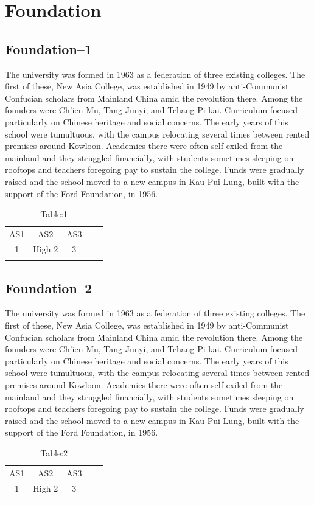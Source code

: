 \section{Foundation}
\subsection{Foundation--1}
The university was formed in 1963 as a federation of three existing colleges. The first of these, New Asia College, was established in 1949 by anti-Communist Confucian scholars from Mainland China amid the revolution there. Among the founders were Ch'ien Mu, Tang Junyi, and Tchang Pi-kai. Curriculum focused particularly on Chinese heritage and social concerns. The early years of this school were tumultuous, with the campus relocating several times between rented premises around Kowloon. Academics there were often self-exiled from the mainland and they struggled financially, with students sometimes sleeping on rooftops and teachers foregoing pay to sustain the college. Funds were gradually raised and the school moved to a new campus in Kau Pui Lung, built with the support of the Ford Foundation, in 1956.
\begin{table}[t]
	\caption{Table:1}
	\label{Table:1}       %
	\centering
	\begin{tabular}{ccccc}
		\hline\noalign{\smallskip}
		AS1 & AS2 &AS3  \\
		\noalign{\smallskip}\hline\noalign{\smallskip}
		1 & High 2	& 3\\
		\noalign{\smallskip}\hline
	\end{tabular}
\end{table}
\subsection{Foundation--2}
The university was formed in 1963 as a federation of three existing colleges. The first of these, New Asia College, was established in 1949 by anti-Communist Confucian scholars from Mainland China amid the revolution there. Among the founders were Ch'ien Mu, Tang Junyi, and Tchang Pi-kai. Curriculum focused particularly on Chinese heritage and social concerns. The early years of this school were tumultuous, with the campus relocating several times between rented premises around Kowloon. Academics there were often self-exiled from the mainland and they struggled financially, with students sometimes sleeping on rooftops and teachers foregoing pay to sustain the college. Funds were gradually raised and the school moved to a new campus in Kau Pui Lung, built with the support of the Ford Foundation, in 1956.

\begin{table}[t]
	\caption{Table:2}
	\label{Table:2}       %
	\centering
	\begin{tabular}{ccccc}
		\hline\noalign{\smallskip}
		AS1 & AS2 &AS3  \\
		\noalign{\smallskip}\hline\noalign{\smallskip}
		1 & High 2	& 3\\
		\noalign{\smallskip}\hline
	\end{tabular}
\end{table}

